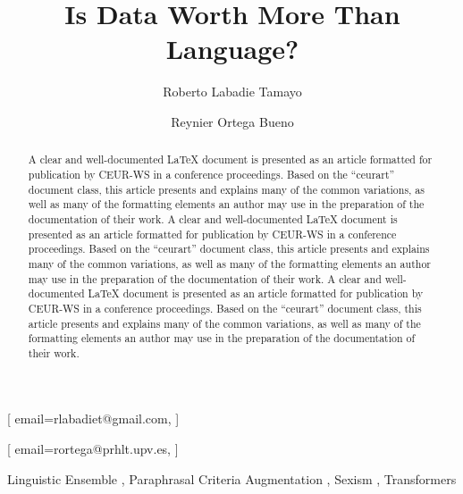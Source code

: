 \documentclass[
]{ceurart}
\begin{document}


\title{Is Data Worth More Than Language?}

\author[1]{Roberto Labadie Tamayo}[%
email=rlabadiet@gmail.com,
]
\address[1]{Universidad de Oriente, Cuba}

\author[2]{Reynier Ortega Bueno}[%
email=rortega@prhlt.upv.es,
]

\address[2]{PRHLT Research Center, Universitat Politècnica de València, Valencia Spain}


\begin{abstract}
  A clear and well-documented \LaTeX{} document is presented as an
  article formatted for publication by CEUR-WS in a conference
  proceedings. Based on the ``ceurart'' document class, this article
  presents and explains many of the common variations, as well as many
  of the formatting elements an author may use in the preparation of
  the documentation of their work.   A clear and well-documented \LaTeX{} document is presented as an  article formatted for publication by CEUR-WS in a conference   proceedings. Based on the ``ceurart'' document class, this article
  presents and explains many of the common variations, as well as many
  of the formatting elements an author may use in the preparation of
  the documentation of their work.  A clear and well-documented \LaTeX{} document is presented as an  article formatted for publication by CEUR-WS in a conference   proceedings. Based on the ``ceurart'' document class, this article
  presents and explains many of the common variations, as well as many
  of the formatting elements an author may use in the preparation of
  the documentation of their work.
\end{abstract}

\begin{keywords}
  Linguistic Ensemble \sep
  Paraphrasal Criteria Augmentation \sep
  Sexism \sep
  Transformers
\end{keywords}
\end{document}
